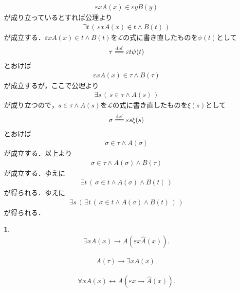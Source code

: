 \documentclass[a4j,10.5pt,oneside,openany]{jsbook}
\theoremstyle{mystyle}
\newtheorem{logicalaxm}[thm]{\color{Mahogany}{推論規則}}
\newcommand{\defeq}{\overset{\mathrm{def}}{=\joinrel=}} %
\begin{document}
\begin{itemize}
\begin{align}
				\varepsilon x A(x) \in \varepsilon y B(y)
			\end{align}
			が成り立っているとすれば公理より
			\begin{align}
				\exists t\, \left(\, \varepsilon x A(x) \in t \wedge B(t)\, \right)
			\end{align}
			が成立する．$\varepsilon x A(x) \in t \wedge B(t)$を$\mathcal{L}$の式に書き直したものを$\psi(t)$として
			\begin{align}
				\tau \defeq \varepsilon t \psi(t)
			\end{align}
			とおけば
			\begin{align}
				\varepsilon x A(x) \in \tau \wedge B(\tau)
			\end{align}
			が成立するが，ここで公理より
			\begin{align}
				\exists s\, \left(\, s \in \tau \wedge A(s)\, \right)
			\end{align}
			が成り立つので，$s \in \tau \wedge A(s)$を$\mathcal{L}$の式に書き直したものを$\xi(s)$として
			\begin{align}
				\sigma \defeq \varepsilon s \xi(s)
			\end{align}
			とおけば
			\begin{align}
				\sigma \in \tau \wedge A(\sigma)
			\end{align}
			が成立する．以上より
			\begin{align}
				\sigma \in \tau \wedge A(\sigma) \wedge B(\tau)
			\end{align}
			が成立する．ゆえに
			\begin{align}
				\exists t\, \left(\, \sigma \in t \wedge A(\sigma) \wedge B(t)\, \right)
			\end{align}
			が得られる．ゆえに
			\begin{align}
				\exists s\, \left(\, \exists t\, \left(\, \sigma \in t \wedge A(\sigma) \wedge B(t)\, \right)\, \right)
			\end{align}
			が得られる．
	\end{itemize}
	
	\begin{screen}
		\begin{logicalaxm}
			\begin{align}
				\exists x A(x) \rightarrow A(\varepsilon x \hat{A}(x)).
			\end{align}
			
			\begin{align}
				A(\tau) \rightarrow \exists x A(x).
			\end{align}
			
			\begin{align}
				\forall x A(x) \leftrightarrow A(\varepsilon x \rightharpoondown \hat{A}(x)).
			\end{align}
			
		\end{logicalaxm}
	\end{screen}
	
\end{document}
